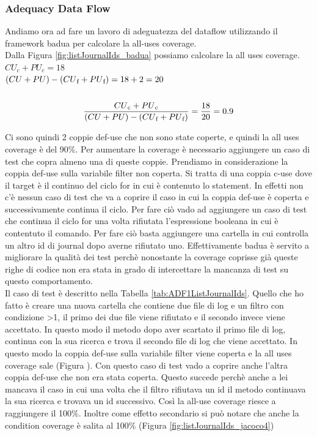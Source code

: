 \documentclass[10pt, a4paper]{article}
\begin{document}
 \subsubsection{Adequacy Data Flow}

 Andiamo ora ad fare un lavoro di adeguatezza del dataflow utilizzando il framework badua per calcolare la all-uses coverage. \\
Dalla Figura \ref{fig:listJournalIds_badua} possiamo calcolare la all uses coverage. \\
\(CU_c + PU_c = 18\) \\
\( (CU + PU) - (CU\textsubscript{f} + PU\textsubscript{f}) = 18 + 2 = 20\) \\ \\
\[\frac{{CU\textsubscript{c} + PU\textsubscript{c}}}{{(CU + PU) - (CU\textsubscript{f} + PU\textsubscript{f})}} = \frac{{18}}{{20}} = 0.9\]

Ci sono quindi 2 coppie def-use che non sono state coperte, e quindi la all uses coverage è del 90\%.
Per aumentare la coverage è necessario aggiungere un caso di test che copra almeno una di queste coppie.
Prendiamo in considerazione la coppia def-use sulla variabile filter non coperta. Si tratta di una coppia c-use 
dove il target è il continuo del ciclo for in cui è contenuto lo statement. In effetti non c'è nessun caso di test
che va a coprire il caso in cui la coppia def-use è coperta e successivamente continua il ciclo.
Per fare ciò vado ad aggiungere un caso di test che continua il ciclo for una volta rifiutata 
l'espressione booleana in cui è contentuto il comando. Per fare ciò basta aggiungere una cartella in cui controlla
un altro id di journal dopo averne rifiutato uno. Effettivamente badua è servito a migliorare la qualità dei 
test perchè nonostante la coverage
coprisse già queste righe di codice non era stata in grado di intercettare la mancanza
di test su questo comportamento. \\
Il caso di test è descritto nella Tabella \ref{tab:ADF1ListJournalIds}. Quello che ho fatto è creare una nuova
cartella che contiene due file di log e un filtro con condizione \textgreater1, il primo dei due file viene rifiutato 
e il secondo invece viene accettato. In questo modo il metodo dopo aver scartato il primo file di log, continua
con la sua ricerca e trova il secondo file di log che viene accettato. In questo modo la coppia
def-use sulla variabile filter viene coperta e la all uses coverage sale (Figura ).
Con questo caso di test vado a coprire anche l'altra coppia def-use che non era stata coperta.
Questo succede perchè anche a lei mancava il caso in cui una volta che il filtro rifiutava un id il
metodo continuava la sua ricerca e trovava un id successivo.
Così la all-use coverage riesce a raggiungere il 100\%. Inoltre come effetto secondario si può notare che anche
la condition coverage è salita al 100\% (Figura \ref{fig:listJournalIds_jacoco4})
\end{document}
